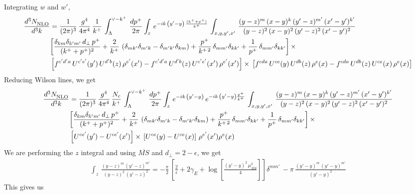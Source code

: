 \documentclass[9pt]{article}
\numberwithin{equation}{section}
\begin{document}
Integrating $w$ and $w'$,
\begin{align}
     \frac{d^{3}N_{\rm NLO}^{\rm}}{d^{3}k}  & = \frac{1}{(2\pi)^{3}}\,\frac{g^{4}}{4\pi^{4}}\,\frac{1}{k^{+}}\,\int_{\Lambda}^{\vee-k^{+}}\, \frac{dp^{+}}{2\pi}\int_{z}\,e^{-ik\,\left(y'-y\right)\, \frac{(k^{+}+p^{+})}{k^{+}}}\,\int_{x,y,y^{\prime},x'}\,\frac{(y-z)^{m}\,(x-y)^{k}\,(y'-z)^{m'}\,(x'-y')^{k'}}{(y-z)^{2}\,(x-y)^{2}\,(y'-z)^{2}\,(x'-y')^{2}}\notag \\ &  \bigg[\frac{\delta_{km}\delta_{k'm'}\,d_{\perp}\,p^{+}}{(k^{+}+p^{+})^{2}}+\frac{2}{k^{+}}\,\left(\delta_{mk'}\delta_{m'k}-\delta_{m'k'}\delta_{km}\right) + \frac{p^{+}}{k^{+\,2}}\,\delta_{mm'}\delta_{kk'}+\frac{1}{p^{+}}\,\delta_{mm'}\delta_{kk'}\bigg]\,\times\,\notag \\ & \left[f^{c'd'a}\,U^{c'e'}(y')\,U^{d'b}(z)\,\rho^{e'}(x')-f^{c'd'a}\,
    U^{d'b}(z)\,U^{c'e'}(x')\,\rho^{e'}(x')\right]\times\, \left[f^{cda}\,U^{ce}(y)\,U^{db}(z)\,\rho^{e}(x)-f^{cda}\,
    U^{db}(z)\,U^{ce}(x)\,\rho^{e}(x)\right]
\end{align}
Reducing Wilson lines, we get
\begin{align}
     \frac{d^{3}N_{\rm NLO}^{\rm}}{d^{3}k}  & = \frac{1}{(2\pi)^{3}}\,\frac{g^{4}}{4\pi^{4}}\,\frac{N_{c}}{k^{+}}\,\int_{\Lambda}^{\vee-k^{+}}\, \frac{dp^{+}}{2\pi}\int_{z}\,e^{-ik\,\left(y'-y\right)}\,e^{-ik\,\left(y'-y\right)\frac{p^{+}}{k^{+}}}\,\int_{x,y,y^{\prime},x'}\,\frac{(y-z)^{m}\,(x-y)^{k}\,(y'-z)^{m'}\,(x'-y')^{k'}}{(y-z)^{2}\,(x-y)^{2}\,(y'-z)^{2}\,(x'-y')^{2}}\notag \\ &  \bigg[\frac{\delta_{km}\delta_{k'm'}\,d_{\perp}\,p^{+}}{(k^{+}+p^{+})^{2}}+\frac{2}{k^{+}}\,\left(\delta_{mk'}\delta_{m'k}-\delta_{m'k'}\delta_{km}\right) + \frac{p^{+}}{k^{+\,2}}\,\delta_{mm'}\delta_{kk'}+\frac{1}{p^{+}}\,\delta_{mm'}\delta_{kk'}\bigg]\,\times\,\notag \\ & \left[U^{ce'}(y') - U^{ce'}(x')\right] \times\, \left[U^{ce}(y) - U^{ce}(x)\right]\, \rho^{e'}(x') \rho^{e}(x)
\end{align}
We are performing the $z$ integral and using $\overline{MS}$ and $d_{\perp} = 2-\epsilon$, we get
\begin{align}
    \int_{z}\, \frac{(y-z)^{m}\,(y'-z)^{m'}}{(y-z)^{2}\,(y'-z)^{2}} = -\frac{\pi}{2}\, \left[\frac{2}{\epsilon} +2\gamma_{E} + \log{\left[\frac{(y'-y)^{2}\,\mu^{2}_{\overline{MS}}}{4}\right]}\right]\delta^{mm'}\, - \pi\, \frac{(y'-y)^{m}\,(y'-y)^{m'}}{(y'-y)^{2}}
\end{align}
This gives us
\end{document}

